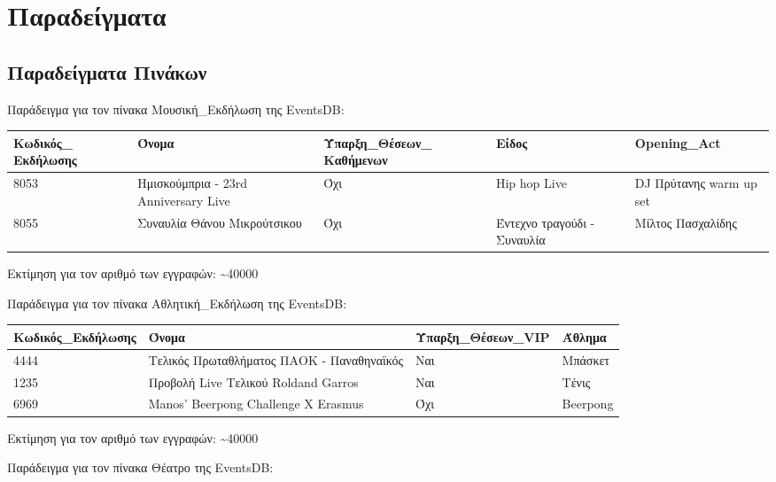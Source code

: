 ﻿\section{Παραδείγματα}

\subsection{Παραδείγματα Πινάκων}

Παράδειγμα για τον πίνακα Μουσική\_Εκδήλωση της EventsDB:

\begin{table}[H]
  \centering
  \footnotesize
\begin{tabular}[c]{|p{2cm}|p{2.5cm}|p{2.5cm}|p{2cm}|p{3.5cm}|}
  \hline
  Κωδικός\_ Εκδήλωσης & Όνομα                           & Ύπαρξη\_Θέσεων\_ Καθήμενων & Είδος                       & Opening\_Act            \\ \hline
  8053                & Ημισκούμπρια - 23rd Anniversary Live & Όχι                         & Hip hop Live                & DJ Πρύτανης warm up set \\ \hline
  8055                & Συναυλία Θάνου Μικρούτσικου     & Όχι                         & Έντεχνο τραγούδι - Συναυλία & Μίλτος Πασχαλίδης       \\ \hline
\end{tabular}
\end{table}

Εκτίμηση για τον αριθμό των εγγραφών: \textasciitilde 40000

Παράδειγμα για τον πίνακα Αθλητική\_Εκδήλωση της EventsDB:

\begin{table}[H]
  \centering
  \footnotesize
  \begin{tabular}{|p{3cm}|p{4cm}|p{3cm}|p{3cm}|}
  \hline
  Κωδικός\_Εκδήλωσης & Όνομα & Ύπαρξη\_Θέσεων\_VIP & Άθλημα \\ \hline
  4444 & Τελικός Πρωταθλήματος ΠΑΟΚ - Παναθηναϊκός & Ναι & Μπάσκετ \\ \hline
  1235 & Προβολή Live Τελικού Roldand Garros & Ναι & Τένις \\ \hline
  6969 & Manos' Beerpong Challenge X Erasmus & Όχι & Beerpong \\ \hline
\end{tabular}
\end{table}
  
Εκτίμηση για τον αριθμό των εγγραφών: \textasciitilde 40000

Παράδειγμα για τον πίνακα Θέατρο της EventsDB:

